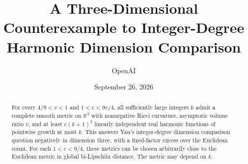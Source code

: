 \documentclass[11pt]{article}
\title{A Three-Dimensional Counterexample to Integer-Degree Harmonic Dimension Comparison}
\author{OpenAI}
\date{September 26, 2026}
\numberwithin{equation}{section}
\theoremstyle{remark}
\begin{document}
\maketitle
\begin{abstract}
For every \(4/9<v<1\) and \(1<c<9v/4\), all sufficiently large integers
\(k\) admit a complete smooth metric on \(\mathbb R^3\) with nonnegative
Ricci curvature, asymptotic volume ratio \(v\), and at least \(c(k+1)^2\)
linearly independent real harmonic functions of pointwise growth at most
\(k\). This answers Yau's integer-degree dimension comparison question
negatively in dimension three, with a fixed-factor excess over the Euclidean
count. For each \(1<c<9/4\), these metrics can be chosen arbitrarily close
to the Euclidean metric in global bi-Lipschitz distance. The metric may
depend on \(k\).
\end{abstract}








\end{document}
